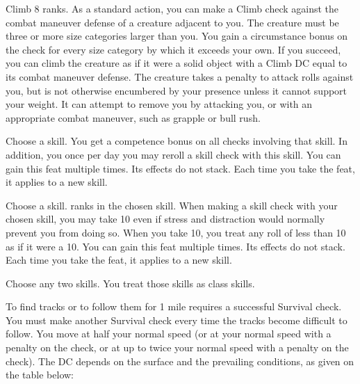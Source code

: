 \featpre Climb 8 ranks. 
\featben As a standard action, you can make a Climb check against the combat maneuver defense of a creature adjacent to you. The creature must be three or more size categories larger than you. You gain a  circumstance bonus on the check for every size category by which it exceeds your own. If you succeed, you can climb the creature as if it were a solid object with a Climb DC equal to its combat maneuver defense. The creature takes a  penalty to attack rolls against you, but is not otherwise encumbered by your presence unless it cannot support your weight. It can attempt to remove you by attacking you, or with an appropriate combat maneuver, such as grapple or bull rush.

Choose a skill.
 You get a  competence bonus on all checks involving that skill. In addition, you once per day you may reroll a skill check with this skill.
 You can gain this feat multiple times. Its effects do not stack. Each time you take the feat, it applies to a new skill.

Choose a skill.
 ranks in the chosen skill.
\featben When making a skill check with your chosen skill, you may take 10 even if stress and distraction would normally prevent you from doing so. When you take 10, you treat any roll of less than 10 as if it were a 10.
 You can gain this feat multiple times. Its effects do not stack. Each time you take the feat, it applies to a new skill.

\featben Choose any two skills. You treat those skills as class skills.

 To find tracks or to follow them for 1 mile requires a successful Survival check. You must make another Survival check every time the tracks become difficult to follow.
You move at half your normal speed (or at your normal speed with a  penalty on the check, or at up to twice your normal speed with a  penalty on the check). The DC depends on the surface and the prevailing conditions, as given on the table below:


